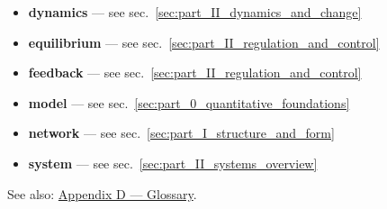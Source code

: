 \documentclass[
]{article}
\providecommand{\tightlist}{%
  \setlength{\itemsep}{0pt}\setlength{\parskip}{0pt}}
\theoremstyle{plain}
\theoremstyle{definition}
\begin{document}
\begin{itemize}
\tightlist
\item
  \textbf{dynamics} --- see sec.~\ref{sec:part_II_dynamics_and_change}
\item
  \textbf{equilibrium} --- see
  sec.~\ref{sec:part_II_regulation_and_control}
\item
  \textbf{feedback} --- see
  sec.~\ref{sec:part_II_regulation_and_control}
\item
  \textbf{model} --- see sec.~\ref{sec:part_0_quantitative_foundations}
\item
  \textbf{network} --- see sec.~\ref{sec:part_I_structure_and_form}
\item
  \textbf{system} --- see sec.~\ref{sec:part_II_systems_overview}
\end{itemize}

See also: \href{../glossary.md}{Appendix D --- Glossary}.



\clearpage


\end{document}

